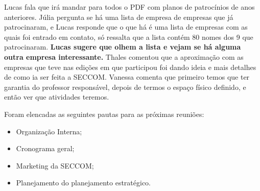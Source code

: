\documentclass{ata-calico}
\begin{document}

Lucas fala que irá mandar para todos o PDF com planos de patrocínios de anos
anteriores. Júlia pergunta se há uma lista de empresa de empresas que já
patrocinaram, e Lucas responde que o que há é uma lista de empresas com as
quais foi entrado em contato, só ressalta que a lista contém 80 nomes dos 9 que
patrocinaram. \textbf{Lucas sugere que olhem a lista e vejam se há alguma outra
empresa interessante.} Thales comentou que a aproximação com as empresas que
teve nas edições em que participou foi dando ideia e mais detalhes de como ia
ser feita a SECCOM\@. Vanessa comenta que primeiro temos que ter garantia do
professor responsável, depois de termos o espaço físico definido, e então ver
que atividades teremos.


Foram elencadas as seguintes pautas para as próximas reuniões:

\begin{itemize}
    \item Organização Interna;
    \item Cronograma geral;
    \item Marketing da SECCOM\@;
    \item Planejamento do planejamento estratégico.
\end{itemize}

\end{document}

